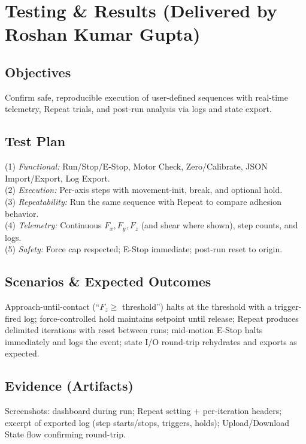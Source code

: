 \documentclass[
    twocolumn,
    fontsize = 10pt,
    parskip = half+,
    headings = small,
    headwidth = text,
    footwidth = text,
]{scrartcl}
\begin{document}
\section{Testing \& Results \textnormal{(Delivered by Roshan Kumar Gupta)}}
\label{sec:testing}

\subsection{Objectives}
Confirm safe, reproducible execution of user-defined sequences with real-time telemetry, Repeat trials, and post-run analysis via logs and state export.

\subsection{Test Plan}
(1) \emph{Functional:} Run/Stop/E-Stop, Motor Check, Zero/Calibrate, JSON Import/Export, Log Export.\\

(2) \emph{Execution:} Per-axis steps with movement-init, break, and optional hold.\\

(3) \emph{Repeatability:} Run the same sequence with Repeat to compare adhesion behavior.\\

(4) \emph{Telemetry:} Continuous $F_x, F_y, F_z$ (and shear where shown), step counts, and logs.\\

(5) \emph{Safety:} Force cap respected; E-Stop immediate; post-run reset to origin.

\subsection{Scenarios \& Expected Outcomes}
Approach-until-contact (``$F_z \ge$ threshold'') halts at the threshold with a trigger-fired log; 
force-controlled hold maintains setpoint until release; 
Repeat produces delimited iterations with reset between runs; 
mid-motion E-Stop halts immediately and logs the event; 
state I/O round-trip rehydrates and exports as expected.

\subsection{Evidence (Artifacts)}
Screenshots: dashboard during run; Repeat setting + per-iteration headers; excerpt of exported log (step starts/stops, triggers, holds); Upload/Download State flow confirming round-trip.
\end{document}

